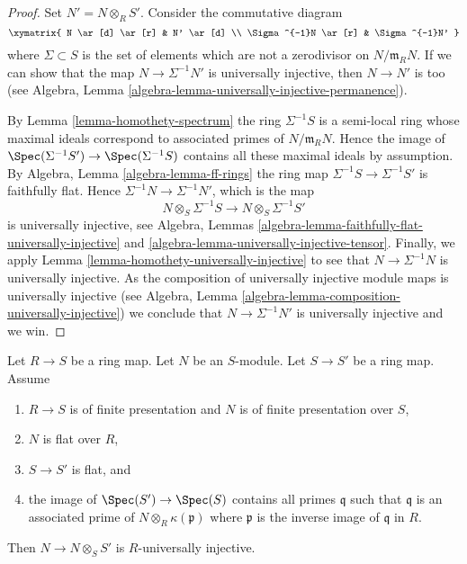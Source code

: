 \begin{proof}
Set $N' = N \otimes_R S'$. Consider the commutative diagram
$$
\xymatrix{
N \ar[d] \ar[r] & N' \ar[d] \\
\Sigma^{-1}N \ar[r] & \Sigma^{-1}N'
}
$$
where $\Sigma \subset S$ is the set of elements which are not a
zerodivisor on $N/\mathfrak m_R N$. If we can show that the map
$N \to \Sigma^{-1}N'$ is universally injective, then $N \to N'$
is too (see
Algebra, Lemma \ref{algebra-lemma-universally-injective-permanence}).

\medskip\noindent
By
Lemma \ref{lemma-homothety-spectrum}
the ring $\Sigma^{-1}S$ is a semi-local ring whose maximal ideals
correspond to associated primes of $N/\mathfrak m_R N$.
Hence the image of
$\Spec(\Sigma^{-1}S') \to \Spec(\Sigma^{-1}S)$
contains all these maximal ideals by assumption. By
Algebra, Lemma \ref{algebra-lemma-ff-rings}
the ring map $\Sigma^{-1}S \to \Sigma^{-1}S'$ is faithfully flat.
Hence $\Sigma^{-1}N \to \Sigma^{-1}N'$, which is the map
$$
N \otimes_S \Sigma^{-1}S \longrightarrow N \otimes_S \Sigma^{-1}S'
$$
is universally injective, see
Algebra, Lemmas \ref{algebra-lemma-faithfully-flat-universally-injective} and
\ref{algebra-lemma-universally-injective-tensor}.
Finally, we apply
Lemma \ref{lemma-homothety-universally-injective}
to see that $N \to \Sigma^{-1}N$ is universally injective.
As the composition of universally injective module maps is universally
injective (see
Algebra, Lemma \ref{algebra-lemma-composition-universally-injective})
we conclude that $N \to \Sigma^{-1}N'$ is universally injective and we win.
\end{proof}

\begin{lemma}
\label{lemma-base-change-universally-flat}
Let $R \to S$ be a ring map.
Let $N$ be an $S$-module.
Let $S \to S'$ be a ring map.
Assume
\begin{enumerate}
\item $R \to S$ is of finite presentation and $N$ is of finite presentation
over $S$,
\item $N$ is flat over $R$,
\item $S \to S'$ is flat, and
\item the image of $\Spec(S') \to \Spec(S)$ contains
all primes $\mathfrak q$ such that $\mathfrak q$ is an associated prime
of $N \otimes_R \kappa(\mathfrak p)$ where $\mathfrak p$ is the inverse
image of $\mathfrak q$ in $R$.
\end{enumerate}
Then $N \to N \otimes_S S'$ is $R$-universally injective.
\end{lemma}


